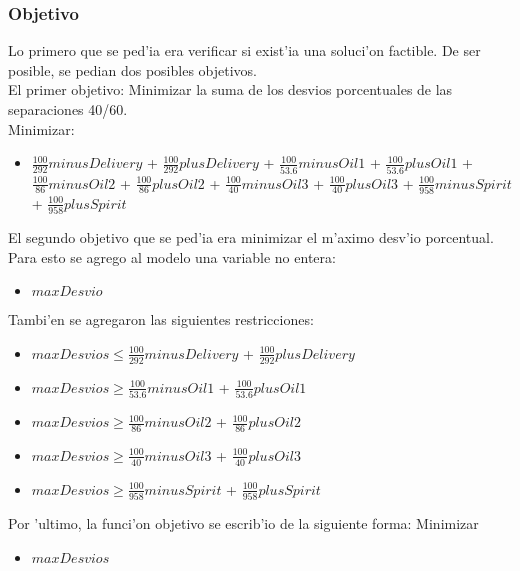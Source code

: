 \subsubsection{Objetivo}
Lo primero que se ped'ia era verificar si exist'ia una soluci'on factible. De ser posible, se pedian dos posibles objetivos.\\
El primer objetivo: Minimizar la suma de los desvios porcentuales de las separaciones 40/60.\\
Minimizar: 
\begin{itemize}
\item $\frac{100}{292} minusDelivery$ + $\frac{100}{292} plusDelivery$ + $\frac{100}{53.6} minusOil1$ + $\frac{100}{53.6} plusOil1$ + $\frac{100}{86} minusOil2$ + $\frac{100}{86} plusOil2$ + $\frac{100}{40} minusOil3$ + $\frac{100}{40} plusOil3$ + $\frac{100}{958} minusSpirit$ + $\frac{100}{958} plusSpirit$
\end{itemize}
El segundo objetivo que se ped'ia era minimizar el m'aximo desv'io porcentual.
Para esto se agrego al modelo una variable no entera:
\begin{itemize}
\item $maxDesvio$
\end{itemize}
Tambi'en se agregaron las siguientes restricciones: 
\begin{itemize}
\item $maxDesvios \leq \frac{100}{292} minusDelivery$ + $\frac{100}{292} plusDelivery$
\item $maxDesvios \geq \frac{100}{53.6} minusOil1$ + $\frac{100}{53.6} plusOil1$
\item $maxDesvios \geq  \frac{100}{86} minusOil2$ + $\frac{100}{86} plusOil2$
\item $maxDesvios \geq \frac{100}{40} minusOil3$ + $\frac{100}{40} plusOil3$
\item $maxDesvios \geq \frac{100}{958} minusSpirit$ + $\frac{100}{958} plusSpirit$
\end{itemize}
Por 'ultimo, la funci'on objetivo se escrib'io de la siguiente forma:
Minimizar
 \begin{itemize}
 \item $maxDesvios$
\end{itemize}
